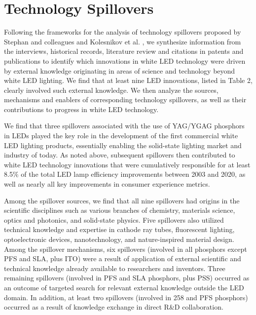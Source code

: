 \documentclass[parskip=full]{article}
\begin{document}
\section{Technology Spillovers}

Following the frameworks for the analysis of technology spillovers proposed by Stephan and colleagues \cite{Stephan2021} and Kolesnikov et al. \cite{kolesnikov2022technology}, we synthesize information from the interviews, historical records, literature review and citations in patents and publications to identify which innovations in white LED technology were driven by external knowledge originating in areas of science and technology beyond white LED lighting. We find that at least nine LED innovations, listed in Table 2, clearly involved such external knowledge. We then analyze the sources, mechanisms and enablers of corresponding technology spillovers, as well as their contributions to progress in white LED technology. 

We find that three spillovers associated with the use of YAG/YGAG phosphors in LEDs played the key role in the development of the first commercial white LED lighting products, essentially enabling the solid-state lighting market and industry of today. As noted above, subsequent spillovers then contributed to white LED technology innovations that were cumulatively responsible for at least 8.5\% of the total LED lamp efficiency improvements between 2003 and 2020, as well as nearly all key improvements in consumer experience metrics.

Among the spillover sources, we find that all nine spillovers had origins in the scientific disciplines such as various branches of chemistry, materials science, optics and photonics, and solid-state physics. Five spillovers also utilized technical knowledge and expertise in cathode ray tubes, fluorescent lighting, optoelectronic devices, nanotechnology, and nature-inspired material design.
Among the spillover mechanisms, six spillovers (involved in all phosphors except PFS and SLA, plus ITO) were a result of application of external scientific and technical knowledge already available to researchers and inventors. Three remaining spillovers (involved in PFS and SLA phosphors, plus PSS) occurred as an outcome of targeted search for relevant external knowledge outside the LED domain. In addition, at least two spillovers (involved in 258 and PFS phosphors) occurred as a result of knowledge exchange in direct R\&D collaboration.
\end{document}
